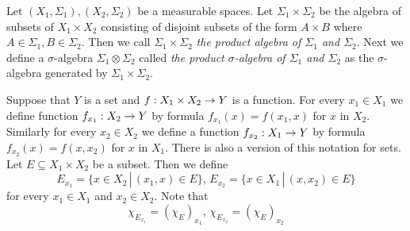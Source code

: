 \begin{definition}
Let $(X_1,\Sigma_1), (X_2,\Sigma_2)$ be a measurable spaces. Let $\Sigma_1\times \Sigma_2$ be the algebra of subsets of $X_1\times X_2$ consisting of disjoint subsets of the form $A\times B$ where $A\in \Sigma_1,B\in \Sigma_2$. Then we call $\Sigma_1\times \Sigma_2$ \textit{the product algebra of $\Sigma_1$ and $\Sigma_2$}. Next we define a $\sigma$-algebra $\Sigma_1\otimes \Sigma_2$ called \textit{the product $\sigma$-algebra of $\Sigma_1$ and $\Sigma_2$} as the $\sigma$-algebra generated by $\Sigma_1\times \Sigma_2$.
\end{definition}
\noindent
Suppose that $Y$ is a set and $f:X_1\times X_2\rightarrow Y$ is a function. For every $x_1\in X_1$ we define function $f_{x_1}:X_2\rightarrow Y$ by formula $f_{x_1}(x) = f(x_1,x)$ for $x$ in $X_2$. Similarly for every $x_2\in X_2$ we define a function $f_{x_2}:X_1\rightarrow Y$ by formula $f_{x_2}(x) = f(x,x_2)$ for $x$ in $X_1$. There is also a version of this notation for sets. Let $E\subseteq X_1\times X_2$ be a subset. Then we define
$$E_{x_1} = \{x\in X_2\,|\,(x_1,x)\in E\},\,E_{x_2} = \{x\in X_1\,|\,(x,x_2)\in E\}$$
for every $x_1\in X_1$ and $x_2\in X_2$. Note that
$$\chi_{E_{x_1}} = \left(\chi_E\right)_{x_1},\,\chi_{E_{x_2}} = \left(\chi_E\right)_{x_2}$$

